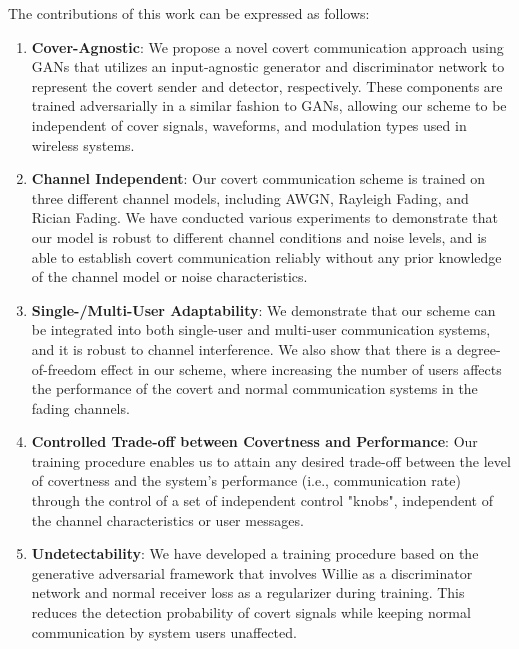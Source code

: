 The contributions of this work can be expressed as follows:
\begin{enumerate}
	\item \textbf{Cover-Agnostic}: We propose a novel covert communication approach using GANs that utilizes an input-agnostic generator and discriminator network to represent the covert sender and detector, respectively. These components are trained adversarially in a similar fashion to GANs, allowing our scheme to be independent of cover signals, waveforms, and modulation types used in wireless systems.
	\item \textbf{Channel Independent}: Our covert communication scheme is trained on three different channel models, including AWGN, Rayleigh Fading, and Rician Fading. We have conducted various experiments to demonstrate that our model is robust to different channel conditions and noise levels, and is able to establish covert communication reliably without any prior knowledge of the channel model or noise characteristics.
	\item \textbf{Single-/Multi-User Adaptability}: We demonstrate that our scheme can be integrated into both single-user and multi-user communication systems, and it is robust to channel interference. We also show that there is a degree-of-freedom effect in our scheme, where increasing the number of users affects the performance of the covert and normal communication systems in the fading channels.
	\item \textbf{Controlled Trade-off between Covertness and Performance}: Our training procedure enables us to attain any desired trade-off between the level of covertness and the system's performance (i.e., communication rate) through the control of a set of independent control "knobs", independent of the channel characteristics or user messages.
	\item \textbf{Undetectability}: We have developed a training procedure based on the generative adversarial framework that involves Willie as a discriminator network and normal receiver loss as a regularizer during training. This reduces the detection probability of covert signals while keeping normal communication by system users unaffected.
\end{enumerate}
